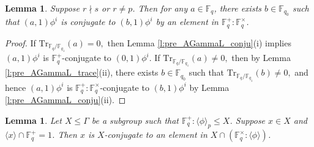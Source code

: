 \documentclass[twoside,a4paper,reqno,11pt]{amsart}
\newcommand{\<}{\langle}
\renewcommand{\>}{\rangle}
\newcommand{\la}{\langle}
\newcommand{\ra}{\rangle}
\newcommand{\leqs}{\leqslant}
\newtheorem{lem}[thm]{Lemma}
\theoremstyle{definition}
\begin{document}
	
	
	
	
	\begin{lem}
		\label{l:pre_AGammaL_conju_subfield}
		Suppose $r\nmid s$ or $r\ne p$. Then for any $a\in\mathbb{F}_q$, there exists $b\in\mathbb{F}_{q_0}$ such that $(a,1)\phi^i$ is conjugate to $(b,1)\phi^i$ by an element in $\mathbb{F}_q^+{:}\mathbb{F}_q^\times$.
	\end{lem}
	
	\begin{proof}
		If $\mathrm{Tr}_{\mathbb{F}_q/\mathbb{F}_{q_1}}(a)=0,$ then Lemma \ref{l:pre_AGammaL_conju}(i) implies $(a,1)\phi^i$ is $\mathbb{F}_q^+$-conjugate to $(0,1)\phi^i.$
		If $\mathrm{Tr}_{\mathbb{F}_q/\mathbb{F}_{q_1}}(a)\neq 0,$ then by Lemma \ref{l:pre_AGammaL_trace}(ii), there exists $b\in \mathbb{F}_{q_0}$ such that $\mathrm{Tr}_{\mathbb{F}_q/\mathbb{F}_{q_1}}(b)\neq 0,$ and hence $(a,1)\phi^i$ is $\mathbb{F}_q^+{:}\mathbb{F}_q^\times$-conjugate to $(b,1)\phi^i$ by Lemma \ref{l:pre_AGammaL_conju}(ii).
	\end{proof}
	
	
	
	\begin{lem}
		\label{l:pre_AGammaL_conju_sub}
		Let $X\leqs\Gamma$ be a subgroup such that $\mathbb{F}_q^+{:}\la\phi\ra_p\leqs X$. Suppose $x\in X$ and $\la x\ra\cap \mathbb{F}_q^+ = 1$. Then $x$ is $X$-conjugate to an element in $X\cap (\mathbb{F}_q^\times{:}\la\phi\ra)$.
	\end{lem}
	
\end{document}
